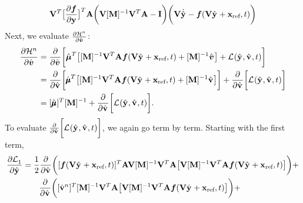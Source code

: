 \documentclass[3p,computermodern,10pt]{elsarticle}
\begin{document}
\begin{appendices}
\begin{equation*}
 \basisspace^T \big[  \frac{\partial \velocity}{\partial \stateyDiscrete} \big]^T 
  \stweightingMatArg{n} \bigg(  \basisspace  [\massArgnt{n}]^{-1}\basisspace^T  \stweightingMatArg{n}- \mathbf{I} \bigg)
 \bigg( \basisspace \genstateyDiscreteDotArgnt{} - \velocity(\veloargsromy) \bigg) 
\end{equation*}
Next, we evaluate $\frac{\partial \hamiltonianArg{n}}{\partial \controllerDumArgnt{}}$:
\begin{align}
  \frac{\partial \hamiltonianArg{n}}{\partial \controllerDumArgnt{}{}} &= \frac{\partial}{\partial \controllerDumArgnt{}{}} \bigg[  \adjointDumArgnt{T} \big[  [\massArgnt{n}]^{-1}\basisspace^T \stweightingMatArg{n}\velocity(\veloargsromy) + [\massArgnt{n}]^{-1}\controllerDumArgnt{} \big] +  \objectiveControlArg{}(\genstateyDiscreteArgnt{},\controllerDiscreteDumArgnt{},t) \bigg] \\
 &= \frac{\partial}{\partial \controllerDiscreteDumArgnt{}{}} \bigg[  \adjointDiscreteDumArgnt{T} \big[  [\massArgnt{n}]^{-1}\basisspace^T \stweightingMatArg{n}\velocity(\veloargsromy) + [\massArgnt{n}]^{-1}\controllerDiscreteDumArgnt{} \big] \bigg]+  \frac{\partial}{\partial \controllerDiscreteDumArgnt{}{}}  \bigg[ \objectiveControlArg{}(\genstateyDiscreteArgnt{},\controllerDiscreteDumArgnt{},\timeDumArg) \bigg] \\
 &= [\adjointDiscreteDumArgnt{}]^T[\massArgnt{n}]^{-1} + \frac{\partial}{\partial \controllerDiscreteDumArgnt{}{}}  \bigg[ \objectiveControlArg{}(\genstateyDiscreteArgnt{},\controllerDiscreteDumArgnt{},t) \bigg]. 
\end{align}
To evaluate $\frac{\partial}{\partial \controllerDiscreteDumArgnt{}{}}  \bigg[ \objectiveControlArg{}(\genstateyDiscreteArgnt{},\controllerDiscreteDumArgnt{},\timeDumArg) \bigg]$, we again 
go term by term. Starting with the first term,
\begin{align*}
\frac{\partial  \objectiveControlArg{}_1 }{\partial \genstateyDiscreteArgnt{}{}} &= 
\frac{1}{2} \frac{\partial }{\partial \controllerDiscreteDumArgnt{}} \bigg( [\velocity(\veloargsromy)]^T \stweightingMatArg{n} \basisspace [\massArgnt{n}]^{-1} \basisspace^T \stweightingMatArg{n}  \big[ \basisspace  [\massArgnt{n}]^{-1}\basisspace^T
\stweightingMatArg{n}  \velocity(\veloargsromy) \big] \bigg) + \\
& \qquad \frac{\partial }{\partial \controllerDiscreteDumArgnt{}{}} \bigg( [\controllerDiscreteDumArgnt{n}]^T [\massArgnt{n}]^{-1} \basisspace^T \stweightingMatArg{n}  \big[ \basisspace  [\massArgnt{n}]^{-1}\basisspace^T
\stweightingMatArg{n}  \velocity(\veloargsromy) \big] \bigg) + \\

\end{align*}
\end{appendices}
\end{document}
